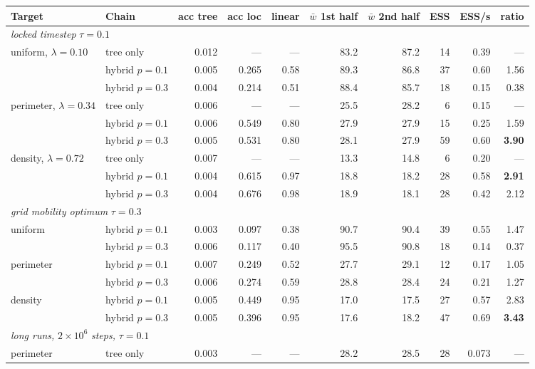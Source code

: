 \documentclass[11pt]{article}
\begin{document}
\begin{table}[htbp]
\centering
\small
\begin{tabular}{llrrrrrrrr}
\toprule
Target & Chain & acc tree & acc loc & linear & $\bar w$ 1st half & $\bar w$ 2nd half & ESS & ESS/s & ratio \\
\midrule
\multicolumn{10}{l}{\emph{locked timestep} $\tau = 0.1$} \\
uniform, $\lambda{=}0.10$ & tree only & 0.012 & --- & --- & 83.2 & 87.2 & 14 & 0.39 & --- \\
 & hybrid $p{=}0.1$ & 0.005 & 0.265 & 0.58 & 89.3 & 86.8 & 37 & 0.60 & 1.56 \\
 & hybrid $p{=}0.3$ & 0.004 & 0.214 & 0.51 & 88.4 & 85.7 & 18 & 0.15 & 0.38 \\
perimeter, $\lambda{=}0.34$ & tree only & 0.006 & --- & --- & 25.5 & 28.2 & 6 & 0.15 & --- \\
 & hybrid $p{=}0.1$ & 0.006 & 0.549 & 0.80 & 27.9 & 27.9 & 15 & 0.25 & 1.59 \\
 & hybrid $p{=}0.3$ & 0.005 & 0.531 & 0.80 & 28.1 & 27.9 & 59 & 0.60 & \textbf{3.90} \\
density, $\lambda{=}0.72$ & tree only & 0.007 & --- & --- & 13.3 & 14.8 & 6 & 0.20 & --- \\
 & hybrid $p{=}0.1$ & 0.004 & 0.615 & 0.97 & 18.8 & 18.2 & 28 & 0.58 & \textbf{2.91} \\
 & hybrid $p{=}0.3$ & 0.004 & 0.676 & 0.98 & 18.9 & 18.1 & 28 & 0.42 & 2.12 \\
\midrule
\multicolumn{10}{l}{\emph{grid mobility optimum} $\tau = 0.3$} \\
uniform & hybrid $p{=}0.1$ & 0.003 & 0.097 & 0.38 & 90.7 & 90.4 & 39 & 0.55 & 1.47 \\
 & hybrid $p{=}0.3$ & 0.006 & 0.117 & 0.40 & 95.5 & 90.8 & 18 & 0.14 & 0.37 \\
perimeter & hybrid $p{=}0.1$ & 0.007 & 0.249 & 0.52 & 27.7 & 29.1 & 12 & 0.17 & 1.05 \\
 & hybrid $p{=}0.3$ & 0.006 & 0.274 & 0.59 & 28.8 & 28.4 & 24 & 0.21 & 1.27 \\
density & hybrid $p{=}0.1$ & 0.005 & 0.449 & 0.95 & 17.0 & 17.5 & 27 & 0.57 & 2.83 \\
 & hybrid $p{=}0.3$ & 0.005 & 0.396 & 0.95 & 17.6 & 18.2 & 47 & 0.69 & \textbf{3.43} \\
\midrule
\multicolumn{10}{l}{\emph{long runs,} $2 \times 10^6$ \emph{steps,} $\tau = 0.1$} \\
perimeter & tree only & 0.003 & --- & --- & 28.2 & 28.5 & 28 & 0.073 & --- \\

\end{tabular}
\end{table}
\end{document}

